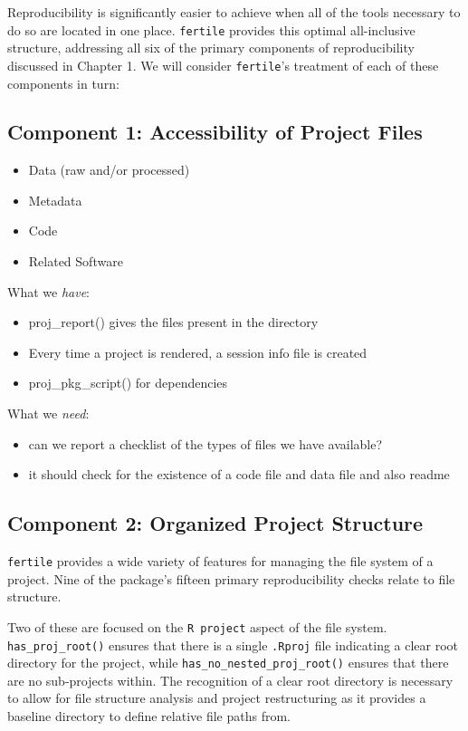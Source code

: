 \documentclass[12pt,twoside]{reedthesis}
\providecommand{\tightlist}{%
  \setlength{\itemsep}{0pt}\setlength{\parskip}{0pt}}
\begin{document}
Reproducibility is significantly easier to achieve when all of the tools
necessary to do so are located in one place. \texttt{fertile} provides
this optimal all-inclusive structure, addressing all six of the primary
components of reproducibility discussed in Chapter 1. We will consider
\texttt{fertile}'s treatment of each of these components in turn:

\subsection{Component 1: Accessibility of Project
Files}\label{component-1-accessibility-of-project-files}
\begin{itemize}
\tightlist
\item
  Data (raw and/or processed)
\item
  Metadata
\item
  Code
\item
  Related Software
\end{itemize}
What we \emph{have}:
\begin{itemize}
\tightlist
\item
  proj\_report() gives the files present in the directory
\item
  Every time a project is rendered, a session info file is created
\item
  proj\_pkg\_script() for dependencies
\end{itemize}
What we \emph{need}:
\begin{itemize}
\tightlist
\item
  can we report a checklist of the types of files we have available?
\item
  it should check for the existence of a code file and data file and
  also readme
\end{itemize}
\subsection{Component 2: Organized Project
Structure}\label{component-2-organized-project-structure}

\texttt{fertile} provides a wide variety of features for managing the
file system of a project. Nine of the package's fifteen primary
reproducibility checks relate to file structure.

Two of these are focused on the \texttt{R\ project} aspect of the file
system. \texttt{has\_proj\_root()} ensures that there is a single
\texttt{.Rproj} file indicating a clear root directory for the project,
while \texttt{has\_no\_nested\_proj\_root()} ensures that there are no
sub-projects within. The recognition of a clear root directory is
necessary to allow for file structure analysis and project restructuring
as it provides a baseline directory to define relative file paths from.
\end{document}
